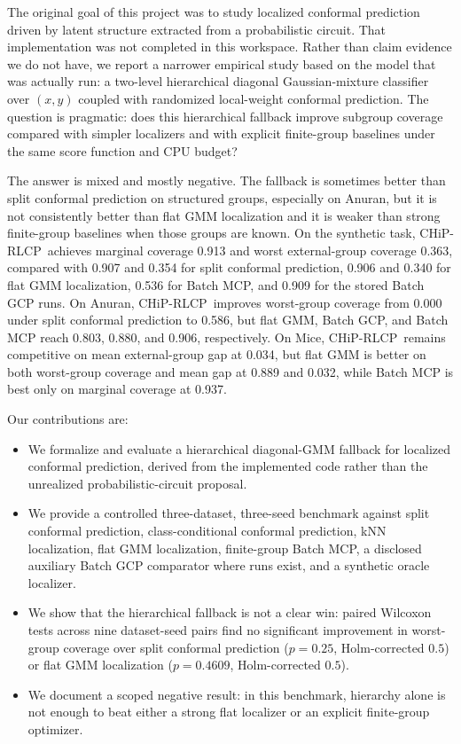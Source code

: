 \documentclass{article}
\newcommand{\chip}{CHiP-RLCP}
\begin{document}
The original goal of this project was to study localized conformal prediction driven by latent structure extracted from a probabilistic circuit. That implementation was not completed in this workspace. Rather than claim evidence we do not have, we report a narrower empirical study based on the model that was actually run: a two-level hierarchical diagonal Gaussian-mixture classifier over $(x,y)$ coupled with randomized local-weight conformal prediction. The question is pragmatic: does this hierarchical fallback improve subgroup coverage compared with simpler localizers and with explicit finite-group baselines under the same score function and CPU budget?

The answer is mixed and mostly negative. The fallback is sometimes better than split conformal prediction on structured groups, especially on Anuran, but it is not consistently better than flat GMM localization and it is weaker than strong finite-group baselines when those groups are known. On the synthetic task, \chip\ achieves marginal coverage 0.913 and worst external-group coverage 0.363, compared with 0.907 and 0.354 for split conformal prediction, 0.906 and 0.340 for flat GMM localization, 0.536 for Batch MCP, and 0.909 for the stored Batch GCP runs. On Anuran, \chip\ improves worst-group coverage from 0.000 under split conformal prediction to 0.586, but flat GMM, Batch GCP, and Batch MCP reach 0.803, 0.880, and 0.906, respectively. On Mice, \chip\ remains competitive on mean external-group gap at 0.034, but flat GMM is better on both worst-group coverage and mean gap at 0.889 and 0.032, while Batch MCP is best only on marginal coverage at 0.937.

Our contributions are:
\begin{itemize}
  \item We formalize and evaluate a hierarchical diagonal-GMM fallback for localized conformal prediction, derived from the implemented code rather than the unrealized probabilistic-circuit proposal.
  \item We provide a controlled three-dataset, three-seed benchmark against split conformal prediction, class-conditional conformal prediction, kNN localization, flat GMM localization, finite-group Batch MCP, a disclosed auxiliary Batch GCP comparator where runs exist, and a synthetic oracle localizer.
  \item We show that the hierarchical fallback is not a clear win: paired Wilcoxon tests across nine dataset-seed pairs find no significant improvement in worst-group coverage over split conformal prediction ($p=0.25$, Holm-corrected $0.5$) or flat GMM localization ($p=0.4609$, Holm-corrected $0.5$).
  \item We document a scoped negative result: in this benchmark, hierarchy alone is not enough to beat either a strong flat localizer or an explicit finite-group optimizer.
\end{itemize}
\end{document}
